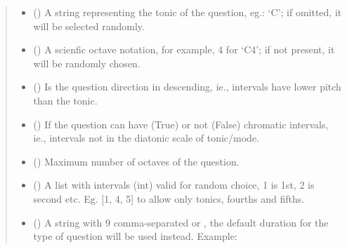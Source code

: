 \documentclass[letterpaper,10pt,english]{sphinxmanual}
\begin{document}
\begin{fulllineitems}
\begin{fulllineitems}
\begin{quote}
\begin{description}
\begin{itemize}
\item {} 
 () \textendash{} A string representing the tonic of the question,
eg.: ‘C’; if omitted, it will be selected randomly.

\item {} 
 () \textendash{} A scienfic octave notation, for example, 4 for ‘C4’;
if not present, it will be randomly chosen.

\item {} 
 () \textendash{} Is the question direction in descending, ie.,
intervals have lower pitch than the tonic.

\item {} 
 () \textendash{} If the question can have (True) or not (False)
chromatic intervals, ie., intervals not in the diatonic scale
of tonic/mode.

\item {} 
 () \textendash{} Maximum number of octaves of the question.

\item {} 
 () \textendash{} A list with intervals (int) valid for
random choice, 1 is 1st, 2 is second etc. Eg. {[}1, 4, 5{]} to
allow only tonics, fourths and fifths.

\item {} 
 () \textendash{} 
A string with 9 comma-separated  or
, the
default duration for the type of question will be used instead.
Example:


\end{itemize}
\end{description}
\end{quote}
\end{fulllineitems}
\end{fulllineitems}
\end{document}
